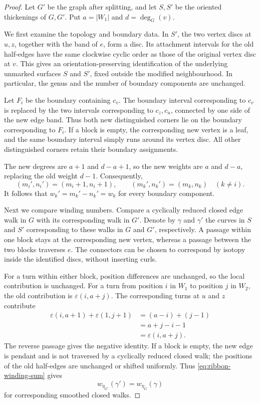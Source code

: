\documentclass[11pt]{amsart}
\theoremstyle{definition}
\theoremstyle{plain}
\theoremstyle{definition}
\theoremstyle{definition}
\begin{document}
\begin{proof}
Let $G'$ be the graph after splitting, and let $S,S'$ be the
oriented thickenings of $G,G'$.  Put
$a=|W_1|$ and $d=\deg_G(v)$.

We first examine the topology and boundary data.
In $S'$, the two vertex discs at $u,z$, together with the band
of $e$, form a disc.  Its attachment intervals for the old
half-edges have the same clockwise cyclic order as those of
the original vertex disc at $v$.  This gives an
orientation-preserving identification of the underlying
unmarked surfaces $S$ and $S'$, fixed outside the modified
neighbourhood.  In particular, the genus and the number of
boundary components are unchanged.

Let $F_i$ be the boundary containing $c_v$.  The boundary
interval corresponding to $c_v$ is replaced by the two
intervals corresponding to $c_z,c_u$, connected by one side
of the new edge band.  Thus both new distinguished corners
lie on the boundary corresponding to $F_i$.
If a block is empty, the corresponding new vertex is a leaf,
and the same boundary interval simply runs around its vertex
disc.  All other distinguished corners retain their boundary
assignments.

The new degrees are $a+1$ and $d-a+1$, so the new weights
are $a$ and $d-a$, replacing the old weight $d-1$.
Consequently,
\[
  (m_i',n_i')=(m_i+1,n_i+1),
  \qquad
  (m_k',n_k')=(m_k,n_k)\quad(k\neq i).
\]
It follows that $w_k'=m_k'-n_k'=w_k$ for every boundary
component.

Next we compare winding numbers.
Compare a cyclically reduced closed edge walk in $G$ with its
corresponding walk in $G'$. Denote by $\gamma$ and $\gamma'$ the curves in $S$ and $S'$ corresponding to these walks in $G$ and $G'$, respectively. A passage within one block stays
at the corresponding new vertex, whereas a passage between
the two blocks traverses $e$.  The connectors can be chosen
to correspond by isotopy inside the identified discs, without
inserting curls.

For a turn within either block, position differences are
unchanged, so the local contribution is unchanged.
For a turn from position $i$ in $W_1$ to position $j$ in
$W_2$, the old contribution is $\varepsilon(i,a+j)$.
The corresponding turns at $u$ and $z$ contribute
\[
\begin{aligned}
  \varepsilon(i,a+1)+\varepsilon(1,j+1)
    &=(a-i)+(j-1)\\
    &=a+j-i-1\\
    &=\varepsilon(i,a+j).
\end{aligned}
\]
The reverse passage gives the negative identity.
If a block is empty, the new edge is pendant and is not
traversed by a cyclically reduced closed walk; the positions
of the old half-edges are unchanged or shifted uniformly.
Thus \eqref{eq:ribbon-winding-sum} gives
\[
  w_{\eta_{G'}}(\gamma')=w_{\eta_G}(\gamma)
\]
for corresponding smoothed closed walks.


\end{proof}
\end{document}
